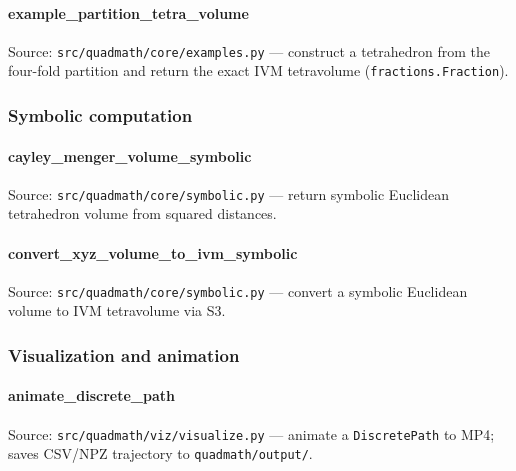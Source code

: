 \documentclass[
  10pt,
]{article}
\newcommand{\passthrough}[1]{#1}
\renewcommand{\texttt}[1]{%
    \colorbox{codebg}{\color{codefg}\ttfamily #1}%
}
\begin{document}
\paragraph{\texorpdfstring{\texttt{example\_partition\_tetra\_volume}}{example\_partition\_tetra\_volume}}\label{code:example_partition_tetra_volume}

Source: \passthrough{\lstinline!src/quadmath/core/examples.py!} ---
construct a tetrahedron from the four-fold partition and return the
exact IVM tetravolume (\passthrough{\lstinline!fractions.Fraction!}).

\subsubsection{Symbolic computation}\label{code:symbolic}

\paragraph{\texorpdfstring{\texttt{cayley\_menger\_volume\_symbolic}}{cayley\_menger\_volume\_symbolic}}\label{code:cayley_menger_volume_symbolic}

Source: \passthrough{\lstinline!src/quadmath/core/symbolic.py!} ---
return symbolic Euclidean tetrahedron volume from squared distances.

\paragraph{\texorpdfstring{\texttt{convert\_xyz\_volume\_to\_ivm\_symbolic}}{convert\_xyz\_volume\_to\_ivm\_symbolic}}\label{code:convert_xyz_volume_to_ivm_symbolic}

Source: \passthrough{\lstinline!src/quadmath/core/symbolic.py!} ---
convert a symbolic Euclidean volume to IVM tetravolume via S3.

\subsubsection{Visualization and animation}\label{code:visualization}

\paragraph{\texorpdfstring{\texttt{animate\_discrete\_path}}{animate\_discrete\_path}}\label{code:animate_discrete_path}

Source: \passthrough{\lstinline!src/quadmath/viz/visualize.py!} ---
animate a \passthrough{\lstinline!DiscretePath!} to MP4; saves CSV/NPZ
trajectory to \passthrough{\lstinline!quadmath/output/!}.
\end{document}
